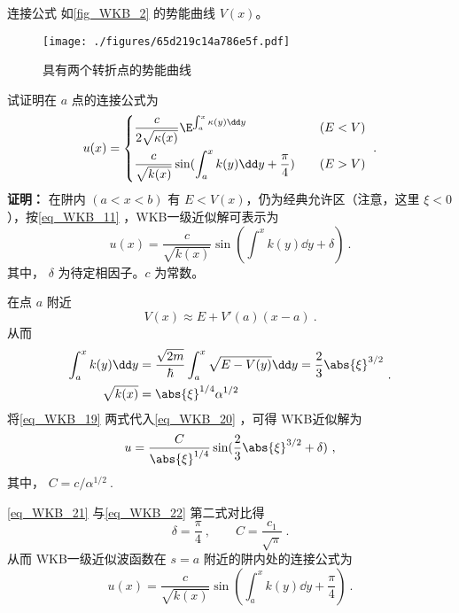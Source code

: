 \begin{example}{连接公式}
如\autoref{fig_WKB_2} 的势能曲线 $V(x)$。
\begin{figure}[ht]
\centering
\texttt{[image: ./figures/65d219c14a786e5f.pdf]}
\caption{具有两个转折点的势能曲线} \label{fig_WKB_2}
\end{figure}
试证明在 $a$ 点的连接公式为
\begin{equation}
u(x)=\left\{\begin{aligned}
&\frac{c}{2\sqrt{\kappa(x)}}\E^{\int_a^x\kappa(y)\dd y} \quad &(E<V)\\
&\frac{c}{\sqrt{k(x)}}\sin(\int_a^x k(y)\dd y+\frac{\pi}{4})\quad &(E>V)
\end{aligned}\right.~.
\end{equation}
\textbf{证明：}
在阱内 $(a<x<b)$ 有 $E<V(x)$，仍为经典允许区（注意，这里 $\xi<0$），按\autoref{eq_WKB_11} ，WKB一级近似解可表示为
\begin{equation}\label{eq_WKB_20}
u(x)=\frac{c}{\sqrt{k(x)}}\sin(\int^x k(y)\dd y+\delta)~.
\end{equation}
其中， $\delta$ 为待定相因子。$c$ 为常数。

在点 $a$ 附近
\begin{equation}
V(x)\approx E+V'(a)(x-a)~.
\end{equation}
从而
\begin{equation}\label{eq_WKB_19}
\begin{aligned}
\int_a^xk(y)\dd y&=
\frac{\sqrt{2m}}{\hbar}\int_a^x\sqrt{E-V(y)}\dd y=\frac{2}{3}\abs{\xi}^{3/2}
\\
\sqrt{k(x)}
&=
\abs{\xi}^{1/4}\alpha^{1/2}
\end{aligned}~.
\end{equation}
将\autoref{eq_WKB_19} 两式代入\autoref{eq_WKB_20} ，可得 WKB近似解为
\begin{equation}\label{eq_WKB_21}
u=
\frac{C}{\abs{\xi}^{1/4}}\sin({\frac{2}{3}\abs{\xi}^{3/2}+\delta})~,
\end{equation}
其中， $C=c/\alpha^{1/2}~.$

\autoref{eq_WKB_21} 与\autoref{eq_WKB_22} 第二式对比得
\begin{equation}\label{eq_WKB_25}
\delta=\frac{\pi}{4}~,\qquad C=\frac{c_1}{\sqrt{\pi}}~.
\end{equation}
从而 WKB一级近似波函数在 $s=a$ 附近的阱内处的连接公式为
\begin{equation}
u(x)=\frac{c}{\sqrt{k(x)}}\sin(\int_a^x k(y)\dd y+\frac{\pi}{4})~.
\end{equation}


\end{example}
